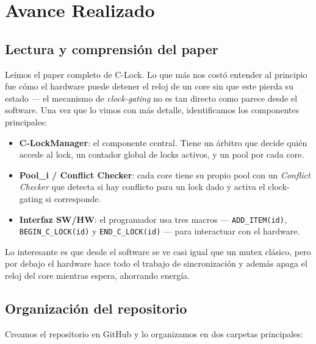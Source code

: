 
\section{Avance Realizado}

\subsection{Lectura y comprensión del paper}

Leímos el paper completo de C-Lock. Lo que más nos costó entender al principio
fue cómo el hardware puede detener el reloj de un core sin que este pierda su
estado — el mecanismo de \textit{clock-gating} no es tan directo como parece
desde el software. Una vez que lo vimos con más detalle, identificamos los
componentes principales:

\begin{itemize}
    \item \textbf{C-LockManager}: el componente central. Tiene un árbitro que
          decide quién accede al lock, un contador global de locks activos, y
          un pool por cada core.
    \item \textbf{Pool\_i / Conflict Checker}: cada core tiene su propio pool
          con un \textit{Conflict Checker} que detecta si hay conflicto para
          un lock dado y activa el clock-gating si corresponde.
    \item \textbf{Interfaz SW/HW}: el programador usa tres macros —
          \texttt{ADD\_ITEM(id)}, \texttt{BEGIN\_C\_LOCK(id)} y
          \texttt{END\_C\_LOCK(id)} — para interactuar con el hardware.
\end{itemize}

Lo interesante es que desde el software se ve casi igual que un mutex clásico,
pero por debajo el hardware hace todo el trabajo de sincronización y además
apaga el reloj del core mientras espera, ahorrando energía.

\subsection{Organización del repositorio}

Creamos el repositorio en GitHub y lo organizamos en dos carpetas principales:

